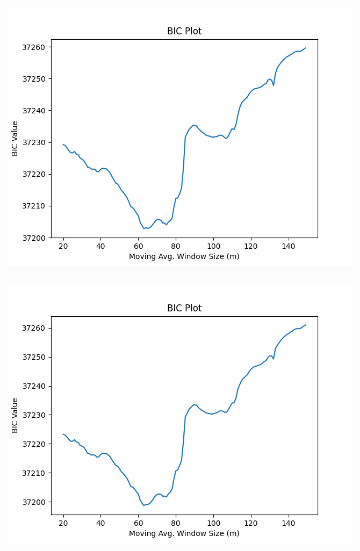 \documentclass[12pt]{article}
\begin{document}
\newpage
\graphicspath{{BICPlots/}}
\begin{figure}[!ht]
  \centering
  \scriptsize
  \setlength{\abovecaptionskip}{1pt}
  \setlength{\belowcaptionskip}{1pt}
  
  \caption[BIC Plots]{
BIC Plots. \textit{See Figure 1 notes}. This figure shows the same BIC plots for the model when the crisis indicator dummy variable is not included.}
\begin{subfigure}[!ht]{0.45\textwidth}
\includegraphics[width=\linewidth]{Prop_ST}
\end{subfigure}\hfill
\begin{subfigure}[!ht]{0.45\textwidth}
    \includegraphics[width=\linewidth]{ST}
  \end{subfigure}


\end{figure}
\end{document}
